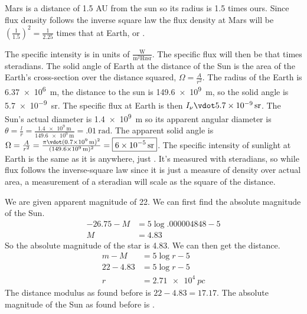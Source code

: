 \documentclass{homework}
\begin{document}
\question
Mars is a distance of 1.5 AU from the sun so its radius is 1.5 times ours. Since flux density follows the inverse square law the flux density at Mars will be $(\frac{1}{1.5})^2 = \frac{1}{2.25}$ times that at Earth, or .


\question
\begin{alphaparts}
	\questionpart The specific intensity is in units of $\frac{\si{\watt}}{\si{\metre^2}\si{\hertz}\si{\steradian}}$. The specific flux will then be that times steradians. The solid angle of Earth at the distance of the Sun is the area of the Earth's cross-section over the distance squared, $\Omega = \frac{A}{r^2}$. The radius of the Earth is \SI{6.37e6}{\metre}, the distance to the sun is \SI{149.6e9}{\metre}, so the solid angle is \SI{5.7e-9}{\steradian}. The specific flux at Earth is then $I_\nu \vdot \SI{5.7e-9}{\steradian}$.
	\questionpart The Sun's actual diameter is \SI{1.4e9}{\metre} so its apparent angular diameter is $\theta = \frac{l}{r} = \frac{\SI{1.4e9}{\metre}}{\SI{149.6e9}{\metre}} = \boxed{\SI{.01}{\radian}}$. The apparent solid angle is $\Omega = \frac{A}{r^2} = \frac{\pi \vdot (\SI{0.7e9}{\metre})^2}{(\SI{149.6e9}{\metre})^2} = \boxed{\SI{6e-5}{\steradian}}$.
	\questionpart The specific intensity of sunlight at Earth is the same as it is anywhere, just . It's measured with steradians, so while flux follows the inverse-square law since it is just a measure of density over actual area, a measurement of a steradian will scale as the square of the distance.
\end{alphaparts}


\question
\begin{alphaparts}
	\questionpart We are given apparent magnitude of 22. We can first find the absolute magnitude of the Sun.
	\begin{align*}
		-26.75 - M	&=	5 \log{.000004848} - 5	\\
		M	&=	4.83
	\end{align*}
	So the absolute magnitude of the star is 4.83. We can then get the distance.
	\begin{align*}
		m - M	&= 	5 \log r - 5	\\
		22 - 4.83	&=	5 \log r - 5	\\
		r	&=	\boxed{\SI{2.71e4}{pc}}
	\end{align*}
	\questionpart The distance modulus as found before is $22 - 4.83 = \boxed{17.17}$.
	\questionpart The absolute magnitude of the Sun as found before is .
\end{alphaparts}
\end{document}
